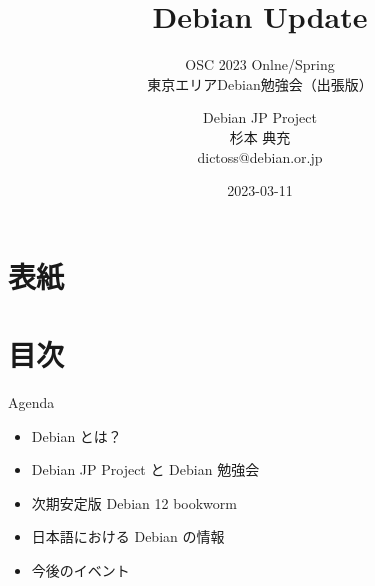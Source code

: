 \title{Debian Update}
\subtitle{OSC 2023 Onlne/Spring \\東京エリアDebian勉強会（出張版）}
\author{Debian JP Project \\杉本 典充\\ dictoss@debian.or.jp}
\date{2023-03-11}




\section{表紙}

\begin{frame}
\titlepage{}
\end{frame}

\section{目次}

\begin{frame}{Agenda}
  \begin{itemize}
  \item Debian とは？
  \item Debian JP Project と Debian 勉強会
  \item 次期安定版 Debian 12 bookworm
  \item 日本語における Debian の情報
  \item 今後のイベント
  \end{itemize}
\end{frame}

